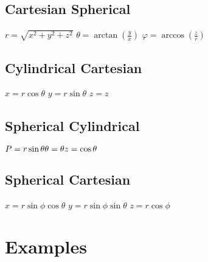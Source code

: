\documentclass[11pt]{article}
\begin{document}
\begin{paracol}{2}
        \subsection{Cartesian \guillemotright Spherical}
        $r=\sqrt{x^2+y^2+z^2}$ \newline
        $\theta = \arctan(\frac{y}{x})$ \newline
        $\varphi = \arccos(\frac{z}{r})$ \newline

        \subsection{Cylindrical \guillemotright Cartesian}
        $x = r \cos\theta$ \newline
        $y = r \sin\theta$ \newline
        $z = z$ \newline

        \subsection{Spherical \guillemotright Cylindrical}
        \begin{fleqn}
            $
            P = r \sin \theta \newline
            \theta = \theta \newline
            z = \cos \theta \newline
            $
        \end{fleqn}

        \switchcolumn

        \subsection*{Spherical \guillemotright Cartesian}
        $x = r \sin\phi \cos \theta$ \newline
        $y = r \sin\phi \sin \theta$    \newline
        $z = r \cos\phi$    \newline
        \section*{Examples}


\end{paracol}
\end{document}
